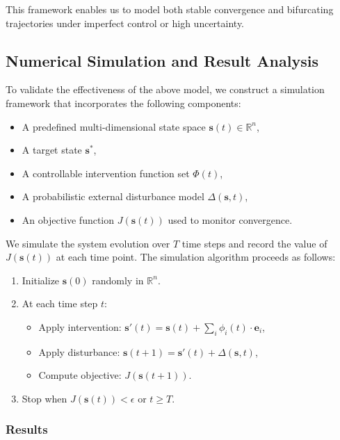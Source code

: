 \documentclass[12pt]{article}
\begin{document}
This framework enables us to model both stable convergence and bifurcating trajectories under imperfect control or high uncertainty.
\subsection{Numerical Simulation and Result Analysis}

To validate the effectiveness of the above model, we construct a simulation framework that incorporates the following components:

\begin{itemize}
  \item A predefined multi-dimensional state space \( \mathbf{s}(t) \in \mathbb{R}^n \),
  \item A target state \( \mathbf{s}^* \),
  \item A controllable intervention function set \( \Phi(t) \),
  \item A probabilistic external disturbance model \( \Delta(\mathbf{s}, t) \),
  \item An objective function \( J(\mathbf{s}(t)) \) used to monitor convergence.
\end{itemize}

We simulate the system evolution over \( T \) time steps and record the value of \( J(\mathbf{s}(t)) \) at each time point. The simulation algorithm proceeds as follows:

\begin{enumerate}
  \item Initialize \( \mathbf{s}(0) \) randomly in \( \mathbb{R}^n \).
  \item At each time step \( t \):
    \begin{itemize}
      \item Apply intervention: \( \mathbf{s}'(t) = \mathbf{s}(t) + \sum_{i} \phi_i(t) \cdot \mathbf{e}_i \),
      \item Apply disturbance: \( \mathbf{s}(t+1) = \mathbf{s}'(t) + \Delta(\mathbf{s}, t) \),
      \item Compute objective: \( J(\mathbf{s}(t+1)) \).
    \end{itemize}
  \item Stop when \( J(\mathbf{s}(t)) < \epsilon \) or \( t \geq T \).
\end{enumerate}

\subsubsection{Results}
\end{document}
